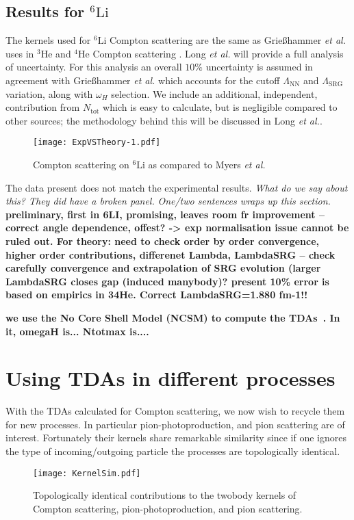 \documentclass[a4paper,11pt]{article}
\newcommand{\Ntot}{N_{\mathrm{tot}}}
\newcommand{\LamSRG}{\Lambda_{\mathrm{SRG}}}
\newcommand{\LamNN}{\Lambda_{\mathrm{NN}}}
\newcommand{\etal}{\textit{et al.}}
\newcommand{\LiS}{{}^{6} \mathrm{Li} }
\newcommand{\HeF}{{}^{4} \mathrm{He}}
\newcommand{\HeT}{{}^{3} \mathrm{He}}
\newcommand{\ques}[1]{\color{red}\textit{ #1 }\color{black}}
\newcommand{\com}[1]{\color{blue}\small\textbf{ #1 }\color{black}\normalsize}
\begin{document}
\subsection{Results for $\LiS$}
The kernels used for $\LiS$ Compton scattering are the same as Grie{\ss}hammer \etal~ uses in $\HeT$ and $\HeF$ Compton scattering \cite{hammer2020, hammer4He}.
Long \etal \cite{upcoming} will provide a full  analysis of uncertainty.
For this analysis an overall $10\%$ uncertainty is assumed in agreement with Grie{\ss}hammer \etal \cite{hammer2020, hammer4He} which accounts for the cutoff $\LamNN$ and $\LamSRG$ variation, 
along with $\omega_H$ selection. 
We include an additional, independent, contribution from $\Ntot$ which is easy to calculate, but is negligible compared to other sources;
the methodology behind this will be discussed in Long \etal \cite{upcoming}.
\begin{figure}[H]
  \centering
  \texttt{[image: ExpVSTheory-1.pdf]}
  \caption{Compton scattering on $\LiS$ as compared to Myers \etal \cite{60MeV}}
  \label{fig:TheoryVSExperiment}
\end{figure}
The data present does not match the experimental results.
\ques{What do we say about this? They did have a broken panel.}
\ques{One/two sentences wraps up this section.}
\com{preliminary, first in 6LI, promising, leaves room fr improvement -- correct angle dependence, offest? -> exp normalisation issue cannot be ruled out. For theory: need to check order by order convergence, higher order contributions, differenet Lambda, LambdaSRG -- check carefully convergence and extrapolation of SRG evolution (larger LambdaSRG closes gap (induced manybody)? present 10\% error is based on empirics in 34He. Correct LambdaSRG=1.880 fm-1!!}

\com{we use the No Core Shell Model (NCSM) to compute the TDAs~\cite{Andreas papers on NCSM}. In it, omegaH is... Ntotmax is....}
\section{Using TDAs in different processes}
With the TDAs calculated for Compton scattering, we now wish to recycle them for new processes.
In particular pion-photoproduction, and
pion scattering are of interest.
Fortunately their kernels share remarkable similarity since if one ignores the type of incoming/outgoing 
particle the processes are topologically identical.
\begin{figure}[H]
\centering
\texttt{[image: KernelSim.pdf]}
\caption{Topologically identical contributions to the twobody kernels of Compton scattering, pion-photoproduction, and pion scattering.}
\end{figure}
\end{document}
